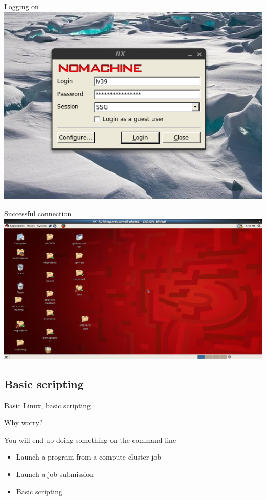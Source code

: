 \documentclass[xcolor=table,compress]{beamer}
\begin{document}
\begin{frame}{Logging on}
\centering
\includegraphics[height=.7\textheight]{nx-login-box.png}
\end{frame}


\begin{frame}{Successful connection}
\centering
\includegraphics[width=1\textheight]{nx-logged-on.png}
\end{frame}


\subsection{Basic scripting}

\begin{frame}
Basic Linux, basic scripting
\end{frame}


\begin{frame}{Why worry?}
\begin{block}{You will end up doing something on the command line}
\begin{itemize}[<+->]
\item Launch a program from a compute-cluster job
\item Launch a job submission
\item Basic scripting
\end{itemize}
\end{block}
\end{frame}
\end{document}
